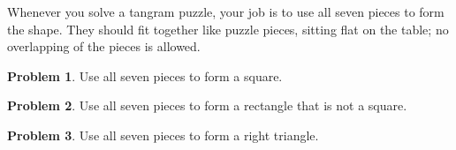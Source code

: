 \documentclass[12pt, reqno]{amsart}
\theoremstyle{remark}
\theoremstyle{definition}
\newtheorem{problem}{Problem}
\numberwithin{equation}{section}  %
\begin{document}
\newpage

Whenever you solve a tangram puzzle, your job is to use all seven pieces to form the shape.  They should fit together like puzzle pieces, sitting flat on the table; no overlapping of the pieces is allowed.

\begin{problem}\label{prob:tangramsquare}
Use all seven pieces to form a square.
\end{problem}

\bigskip

\begin{problem}
Use all seven pieces to form a rectangle that is not a square.
\end{problem}

\bigskip

\begin{problem}
Use all seven pieces to form a right triangle.
\end{problem}

\bigskip
\end{document}
